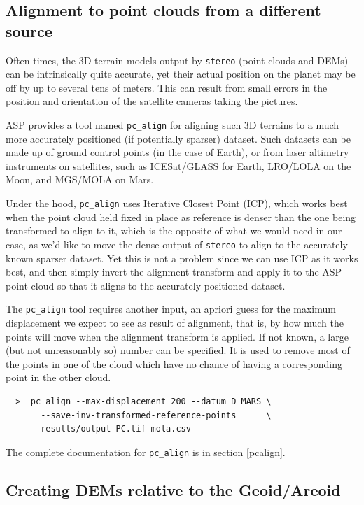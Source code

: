 \subsection{Alignment to point clouds from a different source}

Often times, the 3D terrain models output by \texttt{stereo} (point
clouds and DEMs) can be intrinsically quite accurate, yet their actual
position on the planet may be off by up to several tens of meters. This
can result from small errors in the position and orientation of the
satellite cameras taking the pictures.

ASP provides a tool named \texttt{pc\_align} for aligning such 3D
terrains to a much more accurately positioned (if potentially sparser)
dataset. Such datasets can be made up of ground control points (in the
case of Earth), or from laser altimetry instruments on satellites, such
as ICESat/GLASS for Earth, LRO/LOLA on the Moon, and MGS/MOLA on Mars.

Under the hood, \texttt{pc\_align} uses Iterative Closest Point (ICP),
which works best when the point cloud held fixed in place as reference
is denser than the one being transformed to align to it, which is the
opposite of what we would need in our case, as we'd like to move the
dense output of \texttt{stereo} to align to the accurately known sparser
dataset. Yet this is not a problem since we can use ICP as it works
best, and then simply invert the alignment transform and apply it to the
ASP point cloud so that it aligns to the accurately positioned dataset.

The \texttt{pc\_align} tool requires another input, an apriori guess for
the maximum displacement we expect to see as result of alignment, that
is, by how much the points will move when the alignment transform is
applied. If not known, a large (but not unreasonably so) number can be
specified. It is used to remove most of the points in one of the cloud
which have no chance of having a corresponding point in the other
cloud.

\begin {verbatim}
  >  pc_align --max-displacement 200 --datum D_MARS \
       --save-inv-transformed-reference-points      \
       results/output-PC.tif mola.csv
\end{verbatim}

The complete documentation for \texttt{pc\_align} is in section
\ref{pcalign}.

\subsection{Creating DEMs relative to the Geoid/Areoid}

